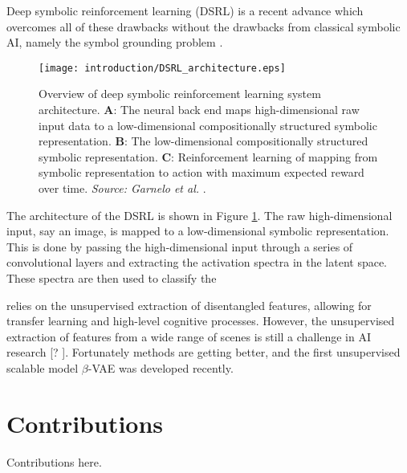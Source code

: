 Deep symbolic reinforcement learning (DSRL) is a recent advance which overcomes all of these drawbacks without the drawbacks from classical symbolic AI, namely the symbol grounding problem \cite{Garnelo2016}.

\begin{figure}[h!]
\centering
\texttt{[image: introduction/DSRL\_architecture.eps]}
\caption{Overview of deep symbolic reinforcement learning system architecture. \textbf{A}: The neural back end maps high-dimensional raw input data to a low-dimensional compositionally structured symbolic representation. \textbf{B}: The low-dimensional compositionally structured symbolic representation. \textbf{C}: Reinforcement learning of mapping from symbolic representation to action with maximum expected reward over time. \textit{Source: Garnelo et al.} \cite{Garnelo2016}.}
\label{fig:dsrl_archiecture}
\end{figure}

The architecture of the DSRL is shown in Figure \ref{fig:dsrl_archiecture}. The raw high-dimensional input, say an image, is mapped to a low-dimensional symbolic representation. This is done by passing the high-dimensional input through a series of convolutional layers and extracting the activation spectra in the latent space. These spectra are then used to classify the  

 relies on the unsupervised extraction of disentangled features, allowing for transfer learning and high-level cognitive processes. However, the unsupervised extraction of features from a wide range of scenes is still a challenge in AI research [? ]. Fortunately methods are getting better, and the first unsupervised scalable model $\beta$-VAE was developed recently.

\section{Contributions}

Contributions here.